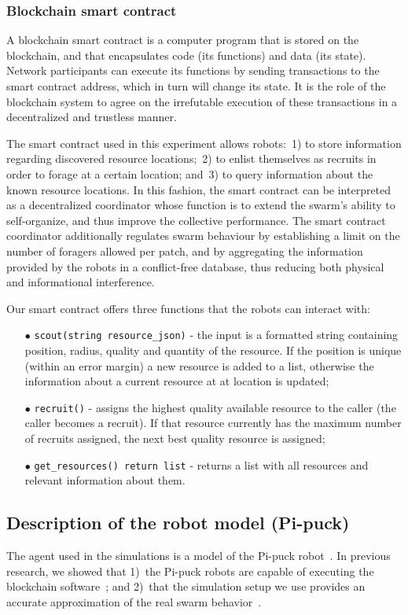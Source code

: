 \documentclass[runningheads]{llncs}
\begin{document}
\subsubsection{Blockchain smart contract}
\label{sec:smart-contract}

A blockchain smart contract is a computer program that is stored on the blockchain, and that encapsulates code (its functions) and data (its state). Network participants can execute its functions by sending transactions to the smart contract address, which in turn will change its state. It is the role of the blockchain system to agree on the irrefutable execution of these transactions in a decentralized and trustless manner.

The smart contract used in this experiment allows robots:~1) to store information regarding discovered resource locations;~2) to enlist themselves as recruits in order to forage at a certain location; and~3) to query information about the known resource locations. In this fashion, the smart contract can be interpreted as a decentralized coordinator whose function is to extend the swarm's ability to self-organize, and thus improve the collective performance. The smart contract coordinator additionally regulates swarm behaviour by establishing a limit on the number of foragers allowed per patch, and by aggregating the information provided by the robots in a conflict-free database, thus reducing both physical and informational interference.

Our smart contract offers three functions that the robots can interact with:
\begin{itemize}
	\item[$\bullet$] \texttt{scout(string resource\_json)} - the input is a formatted string containing position, radius, quality and quantity of the resource. If the position is unique (within an error margin) a new resource is added to a list, otherwise the information about a current resource at at location is updated;
	\item[$\bullet$] \texttt{recruit()} - assigns the highest quality available resource to the caller (the caller becomes a recruit). If that resource currently has the maximum number of recruits assigned, the next best quality resource is assigned;
	\item[$\bullet$] \texttt{get\_resources() return list} - returns a list with all resources and relevant information about them.
\end{itemize}

\subsection{Description of the robot model (Pi-puck)}
The agent used in the simulations is a model of the Pi-puck robot~\cite{millard_2017_iros_pipuck}. In previous research, we showed that 1)~the Pi-puck robots are capable of executing the blockchain software~\cite{pacheco_ants_2020}; and 2)~that the simulation setup we use provides an accurate approximation of the real swarm behavior~\cite{StrCasDor2018:aamas}. 
\end{document}

